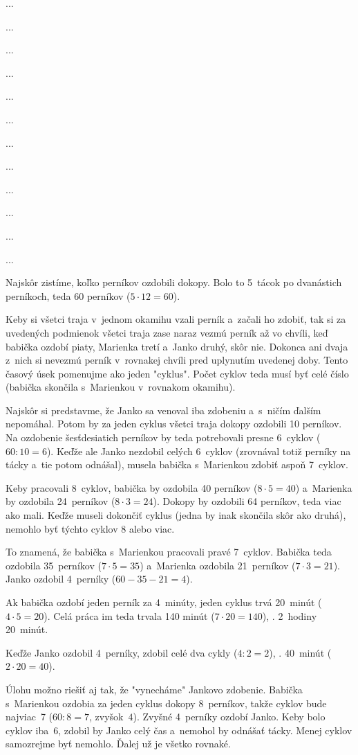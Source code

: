 ﻿{%
...}

{%
...}

{%
...}

{%
...}

{%
...}

{%
...}

{%
...}

{%
...}

{%
...}

{%
...}

{%
...}

{%
...}

{%
Najskôr zistíme, koľko perníkov ozdobili dokopy. Bolo to 5~tácok
po dvanástich perníkoch, teda 60 perníkov ($5\cdot12 = 60$).

Keby si všetci traja v~jednom okamihu vzali perník a~začali ho zdobiť, tak si
za uvedených podmienok všetci traja zase naraz vezmú perník až vo chvíli,
keď babička ozdobí piaty, Marienka tretí a~Janko druhý, skôr nie. Dokonca ani
dvaja z~nich si nevezmú perník v~rovnakej chvíli pred uplynutím uvedenej doby.
Tento časový úsek pomenujme ako jeden "cyklus". Počet cyklov teda musí
byť celé číslo (babička skončila s~Marienkou v~rovnakom okamihu).

Najskôr si predstavme, že Janko sa venoval iba zdobeniu a~s~ničím ďalším
nepomáhal. Potom by za jeden cyklus všetci traja dokopy ozdobili 10 perníkov.
Na ozdobenie šesťdesiatich perníkov by teda potrebovali presne 6~cyklov ($60 : 10 = 6$).
Keďže ale Janko nezdobil celých 6~cyklov (zrovnával totiž perníky na tácky a~tie potom odnášal),
musela babička s~Marienkou zdobiť aspoň 7~cyklov.

Keby pracovali 8~cyklov,
babička by ozdobila 40 perníkov ($8\cdot5 = 40$)
a~Marienka by ozdobila 24~perníkov ($8\cdot3 = 24$).
Dokopy by ozdobili 64 perníkov, teda viac ako mali. Keďže museli dokončiť cyklus
(jedna by inak skončila skôr ako druhá), nemohlo byť týchto cyklov 8 alebo viac.

To znamená, že babička s~Marienkou pracovali pravé 7~cyklov.
Babička teda ozdobila 35~perníkov ($7\cdot5 = 35$)
a~Marienka ozdobila 21~perníkov ($7\cdot3 = 21$).
Janko ozdobil 4~perníky ($60 - 35 - 21 = 4$).

Ak babička ozdobí jeden perník za 4~minúty, jeden cyklus trvá 20~minút
($4\cdot5 = 20$). Celá práca im teda trvala 140 minút ($7\cdot 20 = 140$),
\tj. 2~hodiny 20~minút.

Keďže Janko ozdobil 4~perníky, zdobil celé dva cykly ($4 : 2 = 2$),
\tj. 40~minút ($2\cdot20 = 40$).

\ineriesenie
Úlohu možno riešiť aj tak, že "vynecháme" Jankovo zdobenie. Babička s~Marienkou
ozdobia za jeden cyklus dokopy 8~perníkov, takže cyklov bude najviac~7 ($60 :
8 = 7$, zvyšok~$4$). Zvyšné 4~perníky ozdobí Janko. Keby bolo cyklov iba~6,
zdobil by Janko celý čas a~nemohol by odnášať tácky. Menej cyklov
samozrejme byť nemohlo. Ďalej už je všetko rovnaké.
}

